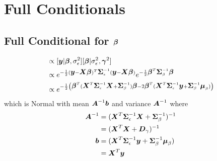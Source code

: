 \documentclass[fleqn]{article}
\def\bm#1{\mbox{\boldmath $#1$}}
\begin{document}
\section{Full Conditionals}
%
\subsection{Full Conditional for $\bm{\beta}$}
%
\begin{align*}
[\bm{\beta} | \cdot] & \propto [\bm{y} | \bm{\beta}, \sigma^2_\epsilon] [\bm{\beta} | \sigma^2_\epsilon, \bm{\gamma}^2]\\
%
& \propto e^{ - \frac{1} {2} (\bm{y} - \bm{X} \bm{\beta})^T \bm{\Sigma}_\epsilon^{ - 1} (\bm{y} - \bm{X} \bm{\beta})} e^{ - \frac{1} {2} \bm{\beta}^T \bm{\Sigma}_\beta^{ - 1} \bm{\beta}}\\
%
& \propto e^{ - \frac{1} {2} \left( \bm{\beta}^T (\bm{X}^T \bm{\Sigma}_\epsilon^{ - 1} \bm{X} + \bm{\Sigma}_\beta^{ - 1}) \bm{\beta} - 2 \bm{\beta}^T (\bm{X}^T \bm{\Sigma}_\epsilon^{ - 1} \bm{y} + \bm{\Sigma}_\beta^{ - 1} \bm{\mu}_\beta) \right) }\\
\end{align*}
%
which is Normal with mean $ \bm{A}^{ - 1} \bm{b}$ and variance $\bm{A}^{ - 1}$ where
\begin{align*}
  \bm{A}^{ - 1} & = (\bm{X}^T \bm{\Sigma}_\epsilon^{ - 1} \bm{X} + \bm{\Sigma}_\beta^{ - 1})^{ - 1}\\
  & = (\bm{X}^T \bm{X} + \bm{D}_\gamma)^{ - 1}\\
  \bm{b} & = (\bm{X}^T \bm{\Sigma}_{\epsilon}^{ - 1} \bm{y} + \bm{\Sigma}_\beta^{ - 1} \bm{\mu}_\beta)\\
  & =  \bm{X}^T \bm{y}
\end{align*}
%
\end{document}
